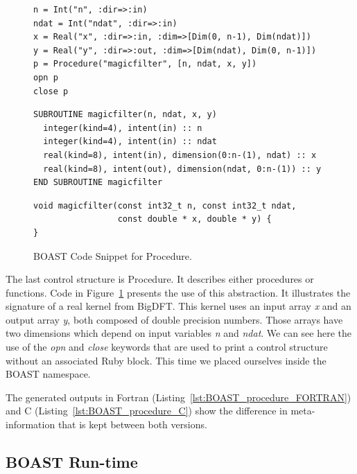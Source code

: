 \documentclass{IEEEtran}
\begin{document}
\begin{figure}
\begin{lstlisting}
n = Int("n", :dir=>:in)
ndat = Int("ndat", :dir=>:in)
x = Real("x", :dir=>:in, :dim=>[Dim(0, n-1), Dim(ndat)])
y = Real("y", :dir=>:out, :dim=>[Dim(ndat), Dim(0, n-1)])
p = Procedure("magicfilter", [n, ndat, x, y])
opn p
close p
\end{lstlisting}


\begin{lstlisting}
SUBROUTINE magicfilter(n, ndat, x, y)
  integer(kind=4), intent(in) :: n
  integer(kind=4), intent(in) :: ndat
  real(kind=8), intent(in), dimension(0:n-(1), ndat) :: x
  real(kind=8), intent(out), dimension(ndat, 0:n-(1)) :: y
END SUBROUTINE magicfilter
\end{lstlisting}

\begin{lstlisting}
void magicfilter(const int32_t n, const int32_t ndat,
                 const double * x, double * y) {
}
\end{lstlisting}
\caption{BOAST Code Snippet for Procedure.}
\label{fig:BOAST_procedure}
\end{figure}

The last control structure is Procedure. It describes either procedures or
functions. Code in Figure~\ref{fig:BOAST_procedure} presents the use of this
abstraction. It illustrates the signature of a real kernel from BigDFT. This
kernel uses an input array \emph{x} and an output array \emph{y}, both composed
of double precision numbers. Those arrays have two dimensions which depend on
input variables \emph{n} and \emph{ndat}. We can see here the use of the
\emph{opn} and \emph{close} keywords that are used to print a control structure
without an associated Ruby block. This time we placed ourselves inside the
BOAST namespace.

The generated outputs in Fortran (Listing~\ref{lst:BOAST_procedure_FORTRAN})
and C (Listing~\ref{lst:BOAST_procedure_C}) show the difference in
meta-information that is kept between both versions.
  
\subsection{BOAST Run-time}
\end{document}

